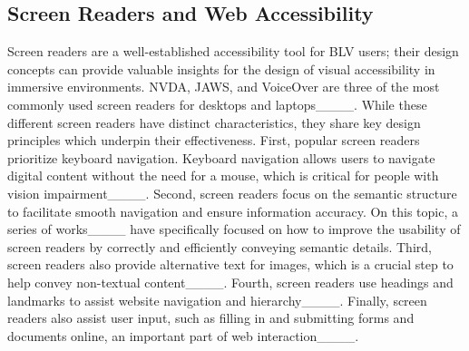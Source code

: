 
\subsection{Screen Readers and Web Accessibility}

Screen readers are a well-established accessibility tool for BLV users; %
their design concepts can provide valuable insights for the design of visual accessibility in immersive environments.
NVDA, JAWS, and VoiceOver are three of the most commonly used screen readers for desktops and laptops____. While these different screen readers have distinct characteristics, they share key design principles which underpin their effectiveness. First, popular screen readers prioritize keyboard navigation. 
Keyboard navigation allows users to navigate digital content without the need for a mouse, which is critical for people with vision impairment____. 
Second, screen readers focus on the semantic structure to facilitate smooth navigation and ensure information accuracy. On this topic, a series of works____ have specifically focused on how to improve the usability of screen readers by correctly and efficiently conveying semantic details. 
Third, screen readers also provide alternative text for images, which is a crucial step to help convey non-textual content____. Fourth, screen readers use headings and landmarks to assist website navigation and hierarchy____. Finally, screen readers also assist user input, such as filling in and submitting forms and documents online, an important part of web interaction____.


